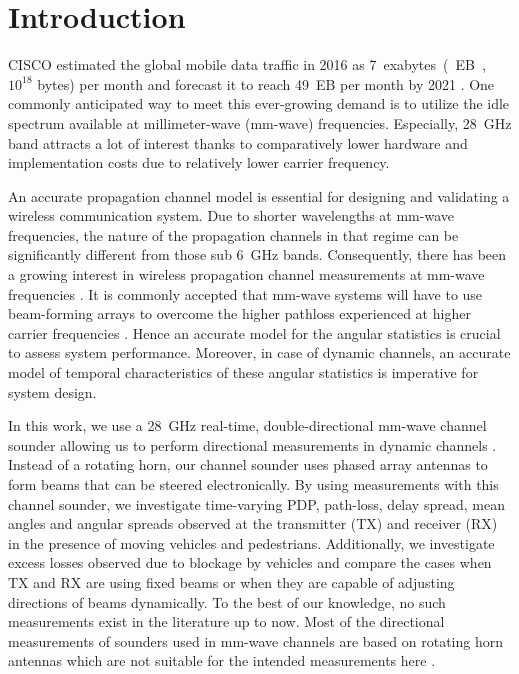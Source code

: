 \documentclass[conference]{IEEEtran}
\begin{document}
\section{Introduction} \label{sec_intro}

CISCO estimated the global mobile data traffic in 2016 as \SI{7} exabytes (EB, $10^{18}$ bytes) per month and forecast it to reach \SI{49}{EB} per month by 2021 \cite{forecast2017cisco}. One commonly anticipated way to meet this ever-growing demand is to utilize the idle spectrum available at millimeter-wave (mm-wave) frequencies. Especially, \SI{28}{GHz} band attracts a lot of interest thanks to comparatively lower hardware and implementation costs due to relatively lower carrier frequency.

An accurate propagation channel model is essential for designing and validating a wireless communication system. Due to shorter wavelengths at mm-wave frequencies, the nature of the propagation channels in that regime can be significantly different from those sub \SI{6}{GHz} bands. Consequently, there has been a growing interest in wireless propagation channel measurements at mm-wave frequencies \cite{Molisch_2016_eucap}. It is commonly accepted that mm-wave systems will have to use beam-forming arrays to overcome the higher pathloss experienced at higher carrier frequencies \cite{Roh2014millimeter}\cite{Molisch_2016_eucap}. Hence an accurate model for the angular statistics is crucial to assess system performance. Moreover, in case of dynamic channels, an accurate model of temporal characteristics of these angular statistics is imperative for system design.


In this work, we use a \SI{28}{GHz} real-time, double-directional mm-wave channel sounder allowing us to perform directional measurements in dynamic channels \cite{bas_realjournal_2017, bas_2017_realtime}. Instead of a rotating horn, our channel sounder uses phased array antennas to form beams that can be steered electronically. By using measurements with this channel sounder, we investigate time-varying PDP, path-loss, delay spread, mean angles and angular spreads observed at the transmitter (TX) and receiver (RX) in the presence of moving vehicles and pedestrians. Additionally, we investigate excess losses observed due to blockage by vehicles and compare the cases when TX and RX are using fixed beams or when they are capable of adjusting directions of beams dynamically. To the best of our knowledge, no such measurements exist in the literature up to now. Most of the directional measurements of sounders used in mm-wave channels are based on  rotating horn antennas which are not suitable for the intended measurements here \cite{MacCartney_2017_flexible,hur_synchronous_2014,Haneda_2016_omni}. 
\end{document}
